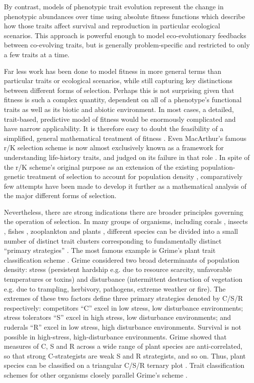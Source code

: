 \documentclass[11pt]{article}
\begin{document}
By contrast, models of phenotypic trait evolution represent the change in phenotypic abundances over time using absolute fitness functions which describe how those traits affect survival and reproduction in particular ecological scenarios. This approach is powerful enough to model eco-evolutionary feedbacks between co-evolving traits, but is generally problem-specific and restricted to only a few traits at a time.

Far less work has been done to model fitness in more general terms than particular traits or ecological scenarios, while still capturing key distinctions between different forms of selection. Perhaps this is not surprising given that fitness is such a complex quantity, dependent on all of a phenotype's functional traits \citep{violle_2007} as well as its biotic and abiotic environment. In most cases, a detailed, trait-based, predictive model of fitness would be enormously complicated and have narrow applicability. It is therefore easy to doubt the feasibility of a simplified, general mathematical treatment of fitness \citep[p. 276]{ewens_2012}. Even MacArthur's famous r/K selection scheme is now almost exclusively known as a framework for understanding life-history traits, and judged on its failure in that role \citep{pianka_1970,stearns_1977,boyce_1984,reznick_2002}. In spite of the r/K scheme's original purpose as an extension of the existing population-genetic treatment of selection to account for population density \citep{macarthur_1962}, comparatively few attempts have been made to develop it further as a mathematical analysis of the major different forms of selection. 

Nevertheless, there are strong indications there are broader principles governing the operation of selection. In many groups of organisms, including corals \citep{darling_2012}, insects \citep{southwood_1977}, fishes \citep{winemiller_1992}, zooplankton \citep{allan_76} and plants \citep{grime_1988}, different species can be divided into a small number of distinct trait clusters corresponding to fundamentally distinct ``primary strategies'' \citep{winemiller_2015}. The most famous example is Grime's plant trait classification scheme \citep{grime_1974,grime_1977,grime_1988}. Grime considered two broad determinants of population density: stress (persistent hardship e.g. due to resource scarcity, unfavorable temperatures or toxins) and disturbance (intermittent destruction of vegetation e.g. due to trampling, herbivory, pathogens, extreme weather or fire).  The extremes of these two factors define three primary strategies denoted by C/S/R respectively: competitors ``C'' excel in low stress, low disturbance environments; stress tolerators ``S'' excel in high stress, low disturbance environments; and ruderals ``R''  excel in low stress, high disturbance environments. Survival is not possible in high-stress, high-disturbance environments. Grime showed that measures of C, S and R across a wide range of plant species are anti-correlated, so that strong C-strategists are weak S and R strategists, and so on. Thus, plant species can be classified on a triangular C/S/R ternary plot \citep{grime_1974}. Trait classification schemes for other organisms closely parallel Grime's scheme \citep{winemiller_2015}. 
\end{document}
